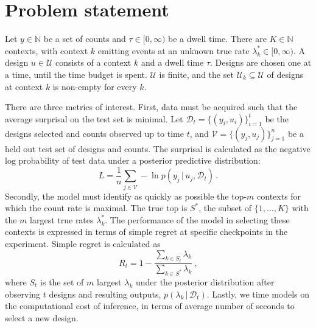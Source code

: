 \documentclass[twoside]{article}
\newcommand\given[1][]{\,#1\vert\,}
\theoremstyle{plain}
\theoremstyle{definition}
\theoremstyle{remark}
\begin{document}

\section{Problem statement} \label{sec:problem}

Let $y \in \mathbb{N}$ be a set of counts and $\tau \in [0, \infty)$ be a dwell time. There are $K \in \mathbb{N}$ contexts, with context $k$ emitting events at an unknown true rate $\lambda^{*}_k \in [0, \infty)$. A design $u \in \mathcal{U}$ consists of a context $k$ and a dwell time $\tau$. Designs are chosen one at a time, until the time budget is spent. $\mathcal{U}$ is finite, and the set $\mathcal{U}_k \subseteq \mathcal{U}$ of designs at context $k$ is non-empty for every $k$.

There are three metrics of interest. First, data must be acquired such that the average surprisal on the test set is minimal. Let $\mathcal{D}_t = \{(y_i, u_i)\}_{i=1}^{t}$ be the designs selected and counts observed up to time $t$, and $\mathcal{V} = \{(y_j, u_j)\}_{j=1}^{n}$ be a held out test set of designs and counts. The surprisal is calculated as the negative log probability of test data under a posterior predictive distribution:
\begin{equation}
	L = \frac{1}{n} \sum_{j \in \mathcal{V}} - \ln p(y_j \given u_j, \mathcal{D}_t) \, .
\end{equation}
Secondly, the model must identify as quickly as possible the top-$m$ contexts for which the count rate is maximal. The true top is $S^{*} $, the subset of $\{1, \dots, K\}$ with the $m$ largest true rates $\lambda^{*}_k$.
The performance of the model in selecting these contexts is expressed in terms of simple regret at specific checkpoints in the experiment. Simple regret is calculated as
\begin{equation}
	R_t = 1 - \frac{\sum_{k \in S_t} \lambda_k}{\sum_{k \in S^{*}} \lambda_k} \, ,
	\label{eq:regret}
\end{equation}
where $S_t$ is the set of $m$ largest $\lambda_k$ under the posterior distribution after observing $t$ designs and resulting outputs, $p(\lambda_k \given \mathcal{D}_t)$.
Lastly, we time models on the computational cost of inference, in terms of average number of seconds to select a new design.
\end{document}
